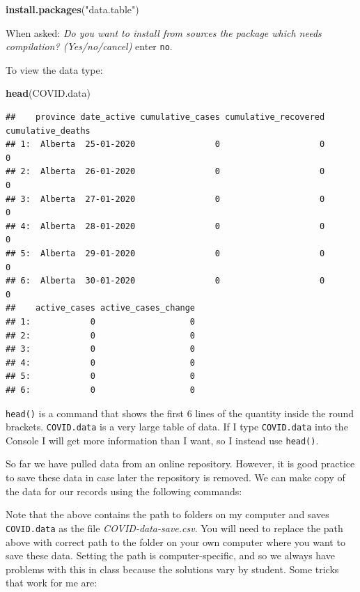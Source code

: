 \documentclass[]{book}
\newenvironment{Shaded}{\begin{snugshade}}{\end{snugshade}}
\newcommand{\KeywordTok}[1]{\textcolor[rgb]{0.13,0.29,0.53}{\textbf{{#1}}}}
\newcommand{\StringTok}[1]{\textcolor[rgb]{0.31,0.60,0.02}{{#1}}}
\newcommand{\NormalTok}[1]{{#1}}
\begin{document}
\begin{Shaded}
\begin{Highlighting}[]
\KeywordTok{install.packages}\NormalTok{(}\StringTok{"data.table"}\NormalTok{)}
\end{Highlighting}
\end{Shaded}

When asked: \emph{Do you want to install from sources the package which
needs compilation? (Yes/no/cancel)} enter \texttt{no}.

To view the data type:

\begin{Shaded}
\begin{Highlighting}[]
\KeywordTok{head}\NormalTok{(COVID.data)}
\end{Highlighting}
\end{Shaded}

\begin{verbatim}
##    province date_active cumulative_cases cumulative_recovered cumulative_deaths
## 1:  Alberta  25-01-2020                0                    0                 0
## 2:  Alberta  26-01-2020                0                    0                 0
## 3:  Alberta  27-01-2020                0                    0                 0
## 4:  Alberta  28-01-2020                0                    0                 0
## 5:  Alberta  29-01-2020                0                    0                 0
## 6:  Alberta  30-01-2020                0                    0                 0
##    active_cases active_cases_change
## 1:            0                   0
## 2:            0                   0
## 3:            0                   0
## 4:            0                   0
## 5:            0                   0
## 6:            0                   0
\end{verbatim}

\texttt{head()} is a command that shows the first 6 lines of the
quantity inside the round brackets. \texttt{COVID.data} is a very large
table of data. If I type \texttt{COVID.data} into the Console I will get
more information than I want, so I instead use \texttt{head()}.

So far we have pulled data from an online repository. However, it is
good practice to save these data in case later the repository is
removed. We can make copy of the data for our records using the
following commands:

Note that the above contains the path to folders on my computer and
saves \texttt{COVID.data} as the file \emph{COVID-data-save.csv}. You
will need to replace the path above with correct path to the folder on
your own computer where you want to save these data. Setting the path is
computer-specific, and so we always have problems with this in class
because the solutions vary by student. Some tricks that work for me are:
\end{document}
